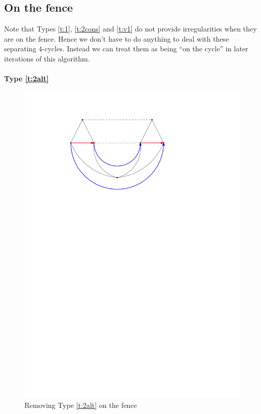 \subsection{On the fence}
  Note that Types \ref{t:1}, \ref{t:2cons} and \ref{t:v1} do not provide irregularities when they are on the fence. Hence we don't have to do anything to deal with these separating $4$-cycles. Instead we can treat them as being ``on the cycle'' in later iterations of this algorithm.


  \paragraph{Type \ref{t:2alt}}

  \begin{figure}[h]
    \centering
    \includegraphics[scale=1]{4cycles/img/fence_c}
    \caption{Removing Type \ref{t:2alt} on the fence}
    \label{fig:4c:fence_c}
  \end{figure}

